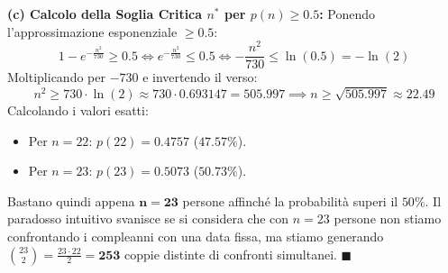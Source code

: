 \begin{dimostrazione}
\textbf{(c) Calcolo della Soglia Critica $n^*$ per $p(n) \ge 0.5$:}
Ponendo l'approssimazione esponenziale $\ge 0.5$:
\begin{equation}
    1 - e^{-\frac{n^2}{730}} \ge 0.5 \iff e^{-\frac{n^2}{730}} \le 0.5 \iff -\frac{n^2}{730} \le \ln(0.5) = -\ln(2)
\end{equation}
Moltiplicando per $-730$ e invertendo il verso:
\begin{equation}
    n^2 \ge 730 \cdot \ln(2) \approx 730 \cdot 0.693147 = 505.997 \implies n \ge \sqrt{505.997} \approx 22.49
\end{equation}
Calcolando i valori esatti:
\begin{itemize}
    \item Per $n = 22$: $p(22) = 0.4757$ ($47.57\%$).
    \item Per $n = 23$: $p(23) = 0.5073$ ($\bm{50.73\%}$).
\end{itemize}
Bastano quindi appena $\bm{n = 23}$ persone affinché la probabilità superi il $50\%$. Il paradosso intuitivo svanisce se si considera che con $n=23$ persone non stiamo confrontando i compleanni con una data fissa, ma stiamo generando $\binom{23}{2} = \frac{23 \cdot 22}{2} = \bm{253}$ coppie distinte di confronti simultanei. $\blacksquare$
\end{dimostrazione}
